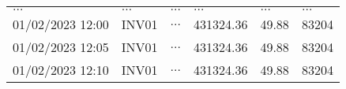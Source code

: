 \begin{table}[H]
\begin{center}
\begin{tabular}[c]{l|l|l|l|l|l}
            $\ldots$                                 &
            $\ldots$                                            &
            $\ldots$                                         &
            $\ldots$                                        &
            $\ldots$&
            $\ldots$                                              \\
            01/02/2023 12:00                                 &
            INV01                                            &
            $\ldots$                                         &
            431324.36                                        &
            49.88 &
            83204                                              \\
            01/02/2023 12:05                                 &
            INV01                                            &
            $\ldots$                                         &
            431324.36                                        &
            49.88 &
            83204                                              \\
            01/02/2023 12:10                                 &
            INV01                                            &
            $\ldots$                                         &
            431324.36                                        &
            49.88 &
            83204                                              \\


\end{tabular}
\end{center}
\end{table}
